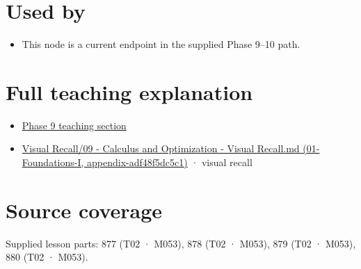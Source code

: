 \section{Used by}\label{appendix-2c2df8345991-used-by}

\begin{itemize}
\tightlist
\item
  This node is a current endpoint in the supplied Phase 9--10 path.
\end{itemize}

\section{Full teaching explanation}\label{appendix-2c2df8345991-full-teaching-explanation}

\begin{itemize}
\tightlist
\item
  \href{Continuous\%20Notes/Computing\%20Foundations\%20-\%20From\%20Bits\%20to\%20C++\%20and\%20Systems\%20APIs\#Optimization\%20and\%20inverse\%20problems}{Phase 9 teaching section}
\item
  \href{../01-Foundations-I/main.pdf\#nameddest=appendix-adf48f5dc5c1}{Visual Recall/09 - Calculus and Optimization - Visual Recall.md (01-Foundations-I, appendix-adf48f5dc5c1)} · visual recall
\end{itemize}

\section{Source coverage}\label{appendix-2c2df8345991-source-coverage}

Supplied lesson parts: 877 (T02 · M053), 878 (T02 · M053), 879 (T02 · M053), 880 (T02 · M053).
